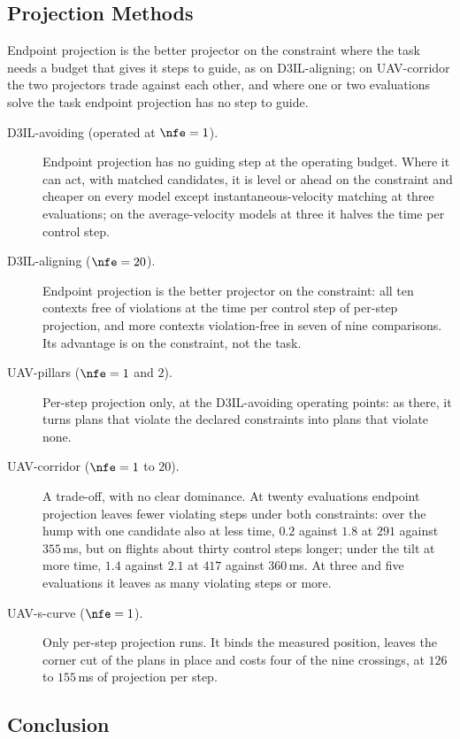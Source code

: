 \subsection{Projection Methods}\label{sec:res:constraints}

Endpoint projection is the better projector on the constraint where the task needs a budget that gives it
steps to guide, as on D3IL-aligning; on UAV-corridor the two projectors trade against each other, and where one
or two evaluations solve the task endpoint projection has no step to guide.

\begin{description}
  \item[D3IL-avoiding (operated at $\nfe=1$).] Endpoint projection has no guiding step at the operating
    budget. Where it can act, with matched candidates, it is level or ahead on the constraint and cheaper on
    every model except instantaneous-velocity matching at three evaluations; on the average-velocity models
    at three it halves the time per control step.
  \item[D3IL-aligning ($\nfe=20$).] Endpoint projection is the better projector on the constraint: all ten
    contexts free of violations at the time per control step of per-step projection, and more contexts
    violation-free in seven of nine comparisons. Its advantage is on the constraint, not the task.
  \item[UAV-pillars ($\nfe=1$ and $2$).] Per-step projection only, at the D3IL-avoiding operating points: as
    there, it turns plans that violate the declared constraints into plans that violate none.
  \item[UAV-corridor ($\nfe=1$ to $20$).] A trade-off, with no clear dominance. At twenty evaluations endpoint
    projection leaves fewer violating steps under both constraints: over the hump with one candidate also at
    less time, $0.2$ against $1.8$ at $291$ against $355$\,ms, but on flights about thirty control steps
    longer; under the tilt at more time, $1.4$ against $2.1$ at $417$ against $360$\,ms. At three and five
    evaluations it leaves as many violating steps or more.
  \item[UAV-s-curve ($\nfe=1$).] Only per-step projection runs. It binds the measured position, leaves the
    corner cut of the plans in place and costs four of the nine crossings, at $126$ to $155$\,ms of
    projection per step.
\end{description}

\subsection{Conclusion}\label{sec:res:summary:conclusion}

